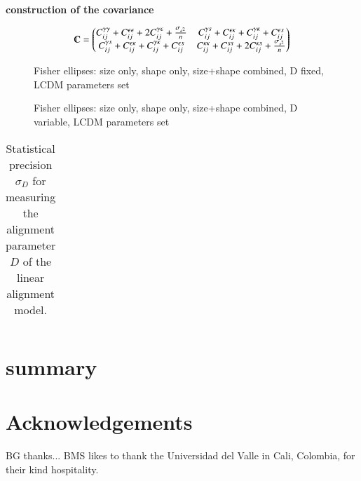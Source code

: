 \documentclass[a4paper,fleqn,usenatbib]{mnras}
\def\spirou#1{{\bf #1}}
\begin{document}
\spirou{construction of the covariance}

$$\varmathbb{C}=\begin{pmatrix}
C_{ij}^{\gamma\gamma}+C_{ij}^{\epsilon\epsilon}+2C_{ij}^{\gamma\epsilon}+\frac{\sigma_{\epsilon^2}}{n} & C_{ij}^{\gamma s}+C_{ij}^{\epsilon\kappa}+C_{ij}^{\gamma\kappa}+C_{ij}^{\epsilon s}   \\
C_{ij}^{\gamma s}+C_{ij}^{\epsilon\kappa}+C_{ij}^{\gamma\kappa}+C_{ij}^{\epsilon s} & C_{ij}^{\kappa\kappa}+C_{ij}^{ss}+2C_{ij}^{\kappa s}+\frac{\sigma_{s^2}}{n}
\end{pmatrix}$$

\begin{figure}
\centering
\caption{Fisher ellipses: size only, shape only, size+shape combined, D fixed, LCDM parameters set}
\label{fig:fisher}
\end{figure}


\begin{figure}
\centering
\caption{Fisher ellipses: size only, shape only, size+shape combined, D variable, LCDM parameters set}
\label{fig:fisher}
\end{figure}


\begin{table}
\center
\begin{tabular}{cc}
\hline\hline\\
\hline
\end{tabular}
\caption{Statistical precision $\sigma_D$ for measuring the alignment parameter $D$ of the linear alignment model.}
\label{tab_precision}
\end{table}


\section{summary}\label{sect_summary}



\section*{Acknowledgements}
BG thanks...   BMS likes to thank the Universidad del Valle in Cali, Colombia, for their kind hospitality.






\bsp
\label{lastpage}
\end{document}
